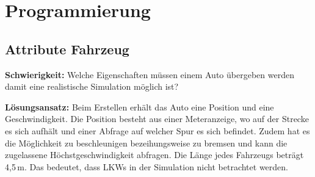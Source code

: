 \chapter{Programmierung}
\section{Attribute Fahrzeug}
\textbf{Schwierigkeit:} Welche Eigenschaften müssen einem Auto übergeben werden damit eine realistische Simulation möglich ist?
\begin{addmargin}[25pt]{0pt}
	\item \textbf{Lösungsansatz:} Beim Erstellen erhält das Auto eine Position und eine Geschwindigkeit. Die Position besteht aus einer Meteranzeige, wo auf der Strecke es sich aufhält und einer Abfrage auf welcher Spur es sich befindet. Zudem hat es die Möglichkeit zu beschleunigen bezeihungsweise zu bremsen und kann die zugelassene Höchstgeschwindigkeit abfragen. Die Länge jedes Fahrzeugs beträgt 4,5\,m. Das bedeutet, dass LKWs in der Simulation nicht betrachtet werden.\\
\end{addmargin}


